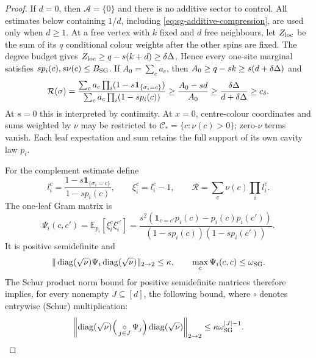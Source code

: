 \begin{proof}
If $d=0$, then $\mathcal A=\{0\}$ and there is no additive sector to
control.  All estimates below containing $1/d$, including
\eqref{eq:sg-additive-compression}, are used only when $d\ge1$.
At a free vertex with $k$ fixed and $d$ free neighbours, let $Z_{\rm loc}$
be the sum of its $q$ conditional colour weights after the other spins are
fixed.  The degree budget gives
$Z_{\rm loc}\ge q-s(k+d)\ge\delta\Delta$.  Hence every one-site
marginal satisfies $sp_i(c),s\nu(c)\le B_{\rm SG}$.  If
$A_0=\sum_ca_c$, then $A_0\ge q-sk\ge s(d+\delta\Delta)$ and
\[
 \mathcal R(\sigma)=\frac{\sum_ca_c\prod_i(1-s\mathbf1_{\{\sigma_i=c\}})}
 {\sum_ca_c\prod_i(1-sp_i(c))}
 \ge \frac{A_0-sd}{A_0}
 \ge \frac{\delta\Delta}{d+\delta\Delta}\ge c_\delta .
\]
At $s=0$ this is interpreted by continuity.  At $x=0$, centre-colour
coordinates and sums weighted by $\nu$ may be restricted to
$\mathcal C_*=\{c:\nu(c)>0\}$; zero-$\nu$ terms vanish.
Each leaf expectation and sum retains the full support of its own
cavity law $p_i$.

For the complement estimate define
\[
 l_i^c=\frac{1-s\mathbf1_{\{\sigma_i=c\}}}{1-sp_i(c)},
 \qquad \xi_i^c=l_i^c-1,
 \qquad \mathcal R=\sum_c\nu(c)\prod_i l_i^c .
\]
The one-leaf Gram matrix is
\[
 \Psi_i(c,c')=\mathbb E_{p_i}[\xi_i^c\xi_i^{c'}]
 =\frac{s^2(\mathbf1_{c=c'}p_i(c)-p_i(c)p_i(c'))}
 {(1-sp_i(c))(1-sp_i(c'))}.
\]
It is positive semidefinite and
\begin{equation}\label{eq:sg-gram-bound}
 \|\operatorname{diag}(\sqrt\nu)\Psi_i\operatorname{diag}(\sqrt\nu)\|_{2\to2}
 \le\kappa,\qquad \max_c\Psi_i(c,c)\le \omega_{\rm SG}.
\end{equation}
The Schur product norm bound for positive semidefinite matrices therefore
implies, for every nonempty $J\subseteq[d]$, the following bound, where
$\circ$ denotes entrywise (Schur) multiplication:
\begin{equation}\label{eq:sg-schur-product}
 \left\|\operatorname{diag}(\sqrt\nu)
 \Big(\mathop{\circ}_{j\in J}\Psi_j\Big)
 \operatorname{diag}(\sqrt\nu)\right\|_{2\to2}
 \le\kappa \omega_{\rm SG}^{|J|-1}.
\end{equation}


\end{proof}
